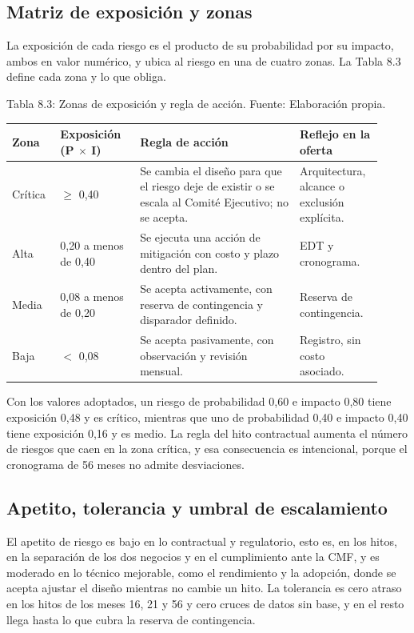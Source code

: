 \documentclass[11pt]{article}
\begin{document}
\subsection{Matriz de exposición y zonas}

La exposición de cada riesgo es el producto de su probabilidad por su impacto, ambos en valor numérico, y ubica al riesgo en una de cuatro zonas. La Tabla 8.3 define cada zona y lo que obliga.

Tabla 8.3: Zonas de exposición y regla de acción. Fuente: Elaboración propia.

\begin{longtable}{p{0.12\linewidth}p{0.20\linewidth}p{0.40\linewidth}p{0.20\linewidth}}
\toprule
\textbf{Zona} & \textbf{Exposición (P $\times$ I)} & \textbf{Regla de acción} & \textbf{Reflejo en la oferta} \\
\midrule
\endhead
\bottomrule
\endlastfoot
Crítica & $\geq$ 0,40 & Se cambia el diseño para que el riesgo deje de existir o se escala al Comité Ejecutivo; no se acepta. & Arquitectura, alcance o exclusión explícita. \\
Alta & 0,20 a menos de 0,40 & Se ejecuta una acción de mitigación con costo y plazo dentro del plan. & EDT y cronograma. \\
Media & 0,08 a menos de 0,20 & Se acepta activamente, con reserva de contingencia y disparador definido. & Reserva de contingencia. \\
Baja & $<$ 0,08 & Se acepta pasivamente, con observación y revisión mensual. & Registro, sin costo asociado. \\
\end{longtable}

Con los valores adoptados, un riesgo de probabilidad 0,60 e impacto 0,80 tiene exposición 0,48 y es crítico, mientras que uno de probabilidad 0,40 e impacto 0,40 tiene exposición 0,16 y es medio. La regla del hito contractual aumenta el número de riesgos que caen en la zona crítica, y esa consecuencia es intencional, porque el cronograma de 56 meses no admite desviaciones.

\subsection{Apetito, tolerancia y umbral de escalamiento}

El apetito de riesgo es bajo en lo contractual y regulatorio, esto es, en los hitos, en la separación de los dos negocios y en el cumplimiento ante la CMF, y es moderado en lo técnico mejorable, como el rendimiento y la adopción, donde se acepta ajustar el diseño mientras no cambie un hito. La tolerancia es cero atraso en los hitos de los meses 16, 21 y 56 y cero cruces de datos sin base, y en el resto llega hasta lo que cubra la reserva de contingencia.
\end{document}
